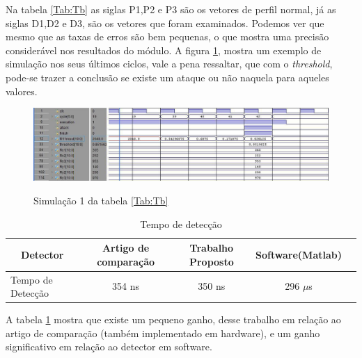Na tabela \ref{Tab:Tb} as siglas P1,P2 e P3 são os vetores de perfil normal, já as siglas D1,D2 e D3, são os vetores que foram examinados. Podemos ver que mesmo que as taxas de erros são bem pequenas, o que mostra uma precisão considerável nos resultados do módulo. A figura \ref{simu}, mostra um exemplo de simulação nos seus últimos ciclos, vale a pena ressaltar, que com o \textit{threshold}, pode-se trazer a conclusão se existe um ataque ou não naquela para aqueles valores.

\begin{figure}[H]
	\centering
	\includegraphics[width=12cm]{figures/simu.jpg}\\
	\caption{Simulação 1 da tabela  \ref{Tab:Tb}}
	\label{simu}
\end{figure}



\begin{table}[H]
	\centering
	\caption{Tempo de detecção}
	\label{Tab:TD}
	\begin{tabular}{lcccc}
		\hline
		\multicolumn{1}{c}{Detector}&\multicolumn{1}{c}{Artigo de comparação }&\multicolumn{1}{c}{Trabalho Proposto}&\multicolumn{1}{c}{Software(Matlab)}
		\\ \midrule
		
		Tempo de Detecção &  354 ns  &  350 ns & 296 $\mu$s  \\   \midrule
	
	\end{tabular}
\end{table}

A tabela \ref{Tab:TD} mostra que existe um pequeno ganho, desse trabalho em relação ao artigo de comparação (também implementado em hardware), e um ganho significativo em relação ao detector em software.


